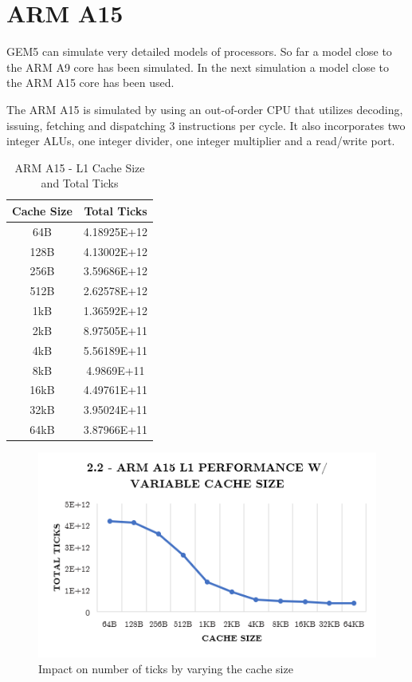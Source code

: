 \documentclass[a4paper, 10pt, conference]{ieeeconf}      %
\begin{document}
\pagebreak

\section{ARM A15}

GEM5 can simulate very detailed models of processors. So far a model close to the ARM A9 core has been simulated. In the next simulation a model close to the ARM A15 core has been used.

The ARM A15 is simulated by using an out-of-order CPU that utilizes decoding, issuing, fetching and dispatching 3 instructions per cycle. It also incorporates two integer ALUs, one integer divider, one integer multiplier and a read/write port.

\begin{table}[h]
\caption{ARM A15 - L1 Cache Size and Total Ticks}
\label{tab:A15}
\begin{center}
\begin{tabular}{|c||c|}
\hline
Cache Size & Total Ticks\\
\hline
64B & 4.18925E+12
\\
\hline
128B & 4.13002E+12
\\
\hline
256B & 3.59686E+12
\\
\hline
512B & 2.62578E+12
\\
\hline
1kB & 1.36592E+12
\\
\hline
2kB & 8.97505E+11
\\
\hline
4kB & 5.56189E+11
\\
\hline
8kB & 4.9869E+11
\\
\hline
16kB & 4.49761E+11
\\
\hline
32kB & 3.95024E+11
\\
\hline
64kB & 3.87966E+11
\\
\hline

\end{tabular}
\end{center}
\end{table}

\begin{figure}[thpb]
\centering
\includegraphics[scale=.5]{ex2_2.png}
\caption{Impact on number of ticks by varying the cache size}
\label{figure2_2}
\end{figure}
\end{document}
